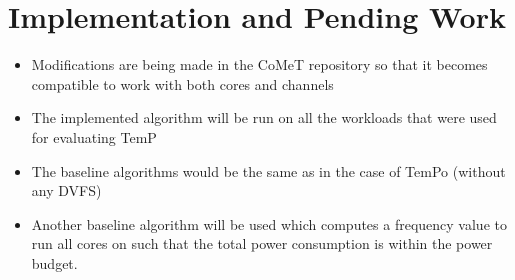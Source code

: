 \documentclass[11pt]{article}
\begin{document}
\section{Implementation and Pending Work}
\begin{itemize}
    \item Modifications are being made in the CoMeT repository so that it becomes compatible to work with both cores and channels
    \item The implemented algorithm will be run on all the workloads that were used for evaluating TemP
    \item The baseline algorithms would be the same as in the case of TemPo (without any DVFS)
    \item Another baseline algorithm will be used which computes a frequency value to run all cores on such that the total power consumption is within the power budget.
\end{itemize}
\end{document}
